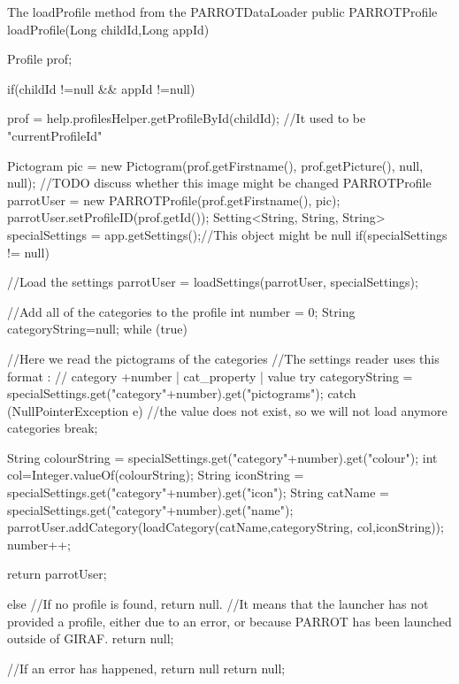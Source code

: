 \begin{source}[{lPf}]{The loadProfile method from the PARROTDataLoader}
public PARROTProfile loadProfile(Long childId,Long appId)	
	{
		Profile prof;

		if(childId !=null && appId !=null)
		{
			prof = help.profilesHelper.getProfileById(childId);	//It used to be "currentProfileId"

			Pictogram pic = new Pictogram(prof.getFirstname(), prof.getPicture(), null, null);	//TODO discuss whether this image might be changed
			PARROTProfile parrotUser = new PARROTProfile(prof.getFirstname(), pic);
			parrotUser.setProfileID(prof.getId());
			Setting<String, String, String> specialSettings = app.getSettings();//This object might be null
			if(specialSettings != null)
			{
				//Load the settings
				parrotUser = loadSettings(parrotUser, specialSettings);

				//Add all of the categories to the profile
				int number = 0;
				String categoryString=null;
				while (true)
				{
					//Here we read the pictograms of the categories
					//The settings reader uses this format :
					// category +number | cat_property | value
					try
					{
						categoryString = specialSettings.get("category"+number).get("pictograms");
					}
					catch (NullPointerException e)
					{
						//the value does not exist, so we will not load anymore categories
						break;
					}

					String colourString = specialSettings.get("category"+number).get("colour");
					int col=Integer.valueOf(colourString);
					String iconString = specialSettings.get("category"+number).get("icon");
					String catName = specialSettings.get("category"+number).get("name");
					parrotUser.addCategory(loadCategory(catName,categoryString,
						col,iconString));
					number++;
				}

				return parrotUser;
			}
			else
			{
				//If no profile is found, return null.
				//It means that the launcher has not provided a profile, either due to an error, or because PARROT has been launched outside of GIRAF.
				return null;
			}
		}
		//If an error has happened, return null
		return null;


	}
\end{source}

